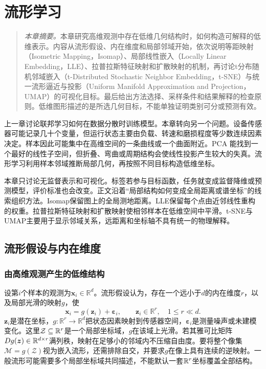 \chapter{流形学习}
\label{chap:manifold}
\begin{quote}\small
\textit{本章摘要。}本章研究高维观测中存在低维几何结构时，如何构造可解释的低维表示。内容从流形假设、内在维度和局部邻域开始，依次说明等距映射（Isometric Mapping，Isomap）、局部线性嵌入（Locally Linear Embedding，LLE）、拉普拉斯特征映射和扩散映射的机制，再讨论t分布随机邻域嵌入（t-Distributed Stochastic Neighbor Embedding，t-SNE）与统一流形逼近与投影（Uniform Manifold Approximation and Projection，UMAP）的可视化目标。最后给出方法选择、采样条件和结果解释的检查原则。低维图形描述的是所选几何目标，不能单独证明类别可分或预测有效。
\end{quote}

上一章讨论联邦学习如何在数据分散时训练模型。本章转向另一个问题。设备传感器可能记录几十个变量，但运行状态主要由负载、转速和磨损程度等少数连续因素决定。样本因此可能集中在高维空间的一条曲线或一个曲面附近。PCA 能找到一个最好的线性子空间，但折叠、弯曲或周期结构会使线性投影产生较大的失真。流形学习利用样本邻域推断局部几何，再按照不同目标构造低维坐标。

本章只讨论无监督表示和可视化。标签若参与目标函数，任务就变成监督降维或预测模型，评价标准也会改变。正文沿着“局部结构如何变成全局距离或谱坐标”的线索组织方法。Isomap保留图上的全局测地距离。LLE保留每个点由近邻线性重构的权重。拉普拉斯特征映射和扩散映射使相邻样本在低维空间中平滑。t-SNE与UMAP主要用于显示邻域关系，远距离和坐标轴不具有统一的物理解释。

\section{流形假设与内在维度}

\subsection{由高维观测产生的低维结构}
设第$i$个样本的观测为$\bm x_i\in\mathbb R^d$。流形假设认为，存在一个远小于$d$的内在维度$r$，以及局部光滑的映射$g$，使
\begin{equation}
 \bm x_i=g(\bm z_i)+\bm\varepsilon_i,
 \qquad \bm z_i\in\mathbb R^r,\quad 1\le r\ll d .
 \label{eq:manifold-generative}
\end{equation}
$\bm z_i$是潜在坐标，$g:\mathbb R^r\to\mathbb R^d$把状态因素映射到传感器空间，$\bm\varepsilon_i$是测量噪声或未建模变化。这里$\mathcal Z\subseteq\mathbb{R}^r$是一个局部坐标域，$g$在该域上光滑。若其雅可比矩阵$Dg(\bm z)\in\mathbb{R}^{d\times r}$满列秩，映射在足够小的邻域内不压缩自由度。要将整个像集$\mathcal M=g(\mathcal Z)$视为嵌入流形，还需排除自交，并要求$g$在像上具有连续的逆映射。一般流形可能需要多个局部坐标域共同描述，不能默认一套$\mathbb{R}^r$坐标覆盖全部结构。

